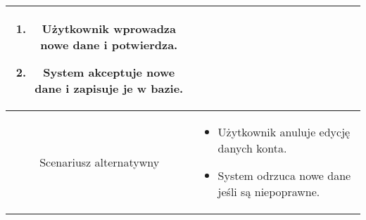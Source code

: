 \documentclass{article}
\begin{document}
\begin{enumerate}
\begin{enumerate}
\begin{table}[H]
\begin{tabular}{|c|p{7cm}|}
\begin{enumerate}
\item Użytkownik wprowadza nowe dane i potwierdza.

\item System akceptuje nowe dane i zapisuje je w bazie.\end{enumerate} \\
						\hline
						Scenariusz alternatywny & \begin{itemize}\item Użytkownik anuluje edycję danych konta.

\item System odrzuca nowe dane jeśli są niepoprawne.\end{itemize}                                                                                                     \\
						\hline
					\end{tabular}
				\end{table}


\end{enumerate}
\end{enumerate}
\end{document}
